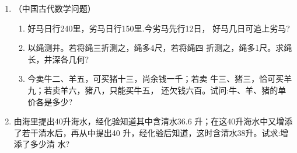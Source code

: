 \begin{enumerate}
\item （中国古代数学问题）
\begin{enumerate}
    \item 好马日行240里，劣马日行150里.今劣马先行12日，
    好马几日可追上劣马?
    \item 以绳测井。若将绳三折测之，绳多4尺，若将绳四
    折测之，绳多1尺。求绳长，井深各几何?
    \item 今卖牛二、羊五，可买猪十三，尚余钱一千；若卖
      牛三、猪三，恰可买羊九；若卖羊六，猪八，只能买牛五，
      还欠钱六百。试问:牛、羊、猪的单价各是多少?
\end{enumerate}


  \item 由海里提出40升海水，经化验知道其中含清水36.6
升；在这40升海水中又增添了若干清水后，再从中提出40
升，经化验后知道，这时含清水38升。试求:增添了多少清
  水?

\end{enumerate}

